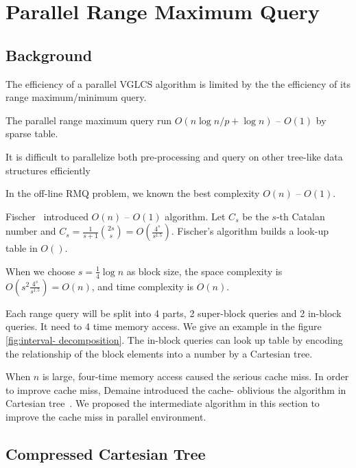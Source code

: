 \section{Parallel Range Maximum Query}
\label{sec:parallelRMQ}

\subsection{Background}

The efficiency of a parallel VGLCS algorithm is limited by the the
efficiency of its range maximum/minimum query.

The parallel range maximum query run $O(n \log n / p + \log n)$ --
$O(1)$ by sparse table. %

It is difficult to parallelize both pre-processing and query on other
tree-like data structures efficiently


In the off-line RMQ problem, we known the best complexity $O(n)$ --
$O(1)$. %

Fischer~\cite{Fischer2006TheoreticalAP} introduced $O(n)$ -- $O(1)$
algorithm.  Let $C_s$ be the $s$-th Catalan number and $C_s =
\frac{1}{s+1}\binom{2s}{s} = O(\frac{4^s}{s^{1.5}})$.  Fischer's
algorithm builds a look-up table in $O()$. %

When we choose $s = \frac{1}{4} \log n$ as block size, the space
complexity is $O(s^2 \frac{4^s}{s^{1.5}}) = O(n)$, and time complexity
is $O(n)$.

Each range query will be split into 4 parts, 2 super-block queries and
2 in-block queries.  It need to 4 time memory access.  We give an
example in the figure \ref{fig:interval- decomposition}.  The in-block
queries can look up table by encoding the relationship of the block
elements into a number by a Cartesian tree.

When $n$ is large, four-time memory access caused the serious cache
miss.  In order to improve cache miss, Demaine introduced the cache-
oblivious the algorithm \cite{Demaine2009OnCT} in Cartesian
tree~\cite{Vuillemin1980AUL}.  We proposed the intermediate algorithm
in this section to improve the cache miss in parallel environment.

\subsection{Compressed Cartesian Tree}

\iffalse 在 Fischer \cite{fischer} 的論文中，根據卡塔蘭數
$\frac{1}{s+1}\binom{2s}{s} = O(\frac{4^s}{s^{1.5}})$ 建立查找表
(lookup-table)，其中選擇 $s = \frac{1}{4} \log n$ 時，空間複雜度
$O(s^2 \frac{4^s}{s^{1.5}}) = o(n)$ 且建表複雜度 $o(n)$。每一個區間詢
問將會拆成 2 個 super-block 和 2 個 in-block 詢問，共計需要 4 次的記憶
體存取。在理論分析上，離線 RMQ 問題可在 $\theta(n)$ -- $\theta(1)$ 時
間內解決任一詢問。當 $n$ 越大時，這 4 次的記憶體存取會遭遇到嚴重的快取
未中 (cache miss)，在 Demaine ~\cite{demaine} 的論文中，發展出快取忘卻
(cache oblivious) 形式的查找方案，降低在離線版本中的 in-block 詢問產生
的快取未中。\fi

